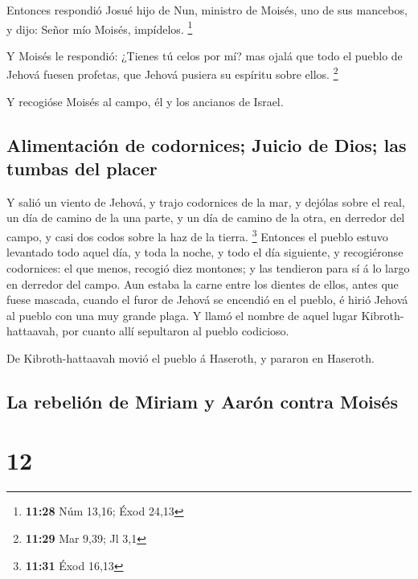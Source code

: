  Entonces respondió Josué hijo de Nun, ministro de Moisés,
uno de sus mancebos, y dijo: Señor mío Moisés, impídelos. \footnote{\textbf{11:28}
  Núm 13,16; Éxod 24,13}

 Y Moisés le respondió: ¿Tienes tú celos por mí? mas ojalá
que todo el pueblo de Jehová fuesen profetas, que Jehová pusiera su
espíritu sobre ellos. \footnote{\textbf{11:29} Mar 9,39; Jl 3,1}

 Y recogióse Moisés al campo, él y los ancianos de Israel.

\hypertarget{alimentaciuxf3n-de-codornices-juicio-de-dios-las-tumbas-del-placer}{%
\subsection{Alimentación de codornices; Juicio de Dios; las tumbas del
placer}\label{alimentaciuxf3n-de-codornices-juicio-de-dios-las-tumbas-del-placer}}

 Y salió un viento de Jehová, y trajo codornices de la mar,
y dejólas sobre el real, un día de camino de la una parte, y un día de
camino de la otra, en derredor del campo, y casi dos codos sobre la haz
de la tierra. \footnote{\textbf{11:31} Éxod 16,13} 
Entonces el pueblo estuvo levantado todo aquel día, y toda la noche, y
todo el día siguiente, y recogiéronse codornices: el que menos, recogió
diez montones; y las tendieron para sí á lo largo en derredor del campo.
 Aun estaba la carne entre los dientes de ellos, antes que
fuese mascada, cuando el furor de Jehová se encendió en el pueblo, é
hirió Jehová al pueblo con una muy grande plaga.  Y llamó
el nombre de aquel lugar Kibroth-hattaavah, por cuanto allí sepultaron
al pueblo codicioso.

 De Kibroth-hattaavah movió el pueblo á Haseroth, y pararon
en Haseroth.

\hypertarget{la-rebeliuxf3n-de-miriam-y-aaruxf3n-contra-moisuxe9s}{%
\subsection{La rebelión de Miriam y Aarón contra
Moisés}\label{la-rebeliuxf3n-de-miriam-y-aaruxf3n-contra-moisuxe9s}}

\hypertarget{section-11}{%
\section{12}\label{section-11}}

